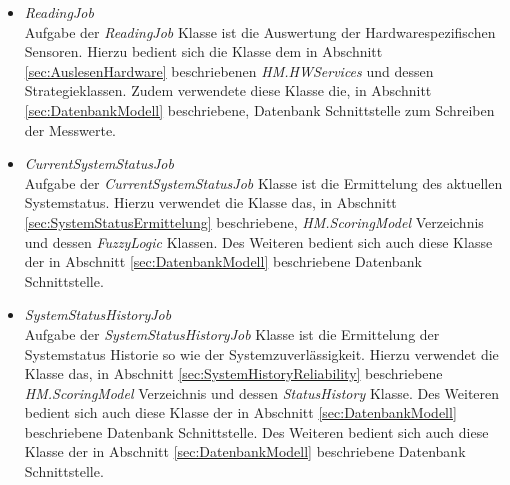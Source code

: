 \begin{itemize}
    \item \textit{ReadingJob}\\
    Aufgabe der \textit{ReadingJob} Klasse ist die Auswertung der Hardwarespezifischen Sensoren. Hierzu bedient sich die Klasse dem in Abschnitt \ref{sec:AuslesenHardware} beschriebenen \textit{HM.HWServices} und dessen Strategieklassen. Zudem verwendete diese Klasse die, in Abschnitt \ref{sec:DatenbankModell} beschriebene, Datenbank Schnittstelle zum Schreiben der Messwerte. 
    \item \textit{CurrentSystemStatusJob}\\
    Aufgabe der \textit{CurrentSystemStatusJob} Klasse ist die Ermittelung des aktuellen Systemstatus. Hierzu verwendet die Klasse das, in Abschnitt \ref{sec:SystemStatusErmittelung} beschriebene, \textit{HM.ScoringModel} Verzeichnis und dessen \textit{FuzzyLogic} Klassen. Des Weiteren bedient sich auch diese Klasse der in Abschnitt \ref{sec:DatenbankModell} beschriebene Datenbank Schnittstelle.
    \item \textit{SystemStatusHistoryJob}\\
    Aufgabe der \textit{SystemStatusHistoryJob} Klasse ist die Ermittelung der Systemstatus Historie so wie der Systemzuverlässigkeit. Hierzu verwendet die Klasse das, in Abschnitt \ref{sec:SystemHistoryReliability} beschriebene \textit{HM.ScoringModel} Verzeichnis und dessen \textit{StatusHistory} Klasse. Des Weiteren bedient sich auch diese Klasse der in Abschnitt \ref{sec:DatenbankModell} beschriebene Datenbank Schnittstelle. Des Weiteren bedient sich auch diese Klasse der in Abschnitt \ref{sec:DatenbankModell} beschriebene Datenbank Schnittstelle.    
\end{itemize}

